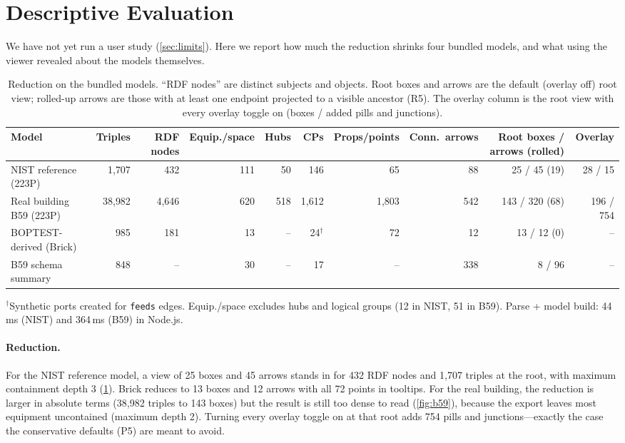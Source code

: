 \documentclass[10pt,twocolumn]{article}
\newcommand{\pred}[1]{\texttt{#1}}   %
\begin{document}
\section{Descriptive Evaluation}
\label{sec:eval}

We have not yet run a user study (\cref{sec:limits}). Here we report how much the
reduction shrinks four bundled models, and what using the viewer revealed about
the models themselves.

\begin{table}[t]
\centering
\small
\caption{Reduction on the bundled models. ``RDF nodes'' are distinct subjects and
objects. Root boxes and arrows are the default (overlay off) root view; rolled-up
arrows are those with at least one endpoint projected to a visible ancestor
(R5). The overlay column is the root view with every overlay toggle on (boxes /
added pills and junctions).}
\label{tab:stats}
\begin{tabular}{lrrrrrrrrr}
\toprule
Model & Triples & RDF nodes & Equip./space & Hubs & CPs & Props/points & Conn.\ arrows & Root boxes / arrows (rolled) & Overlay \\
\midrule
NIST reference (223P) & 1{,}707 & 432 & 111 & 50 & 146 & 65 & 88 & 25 / 45 (19) & 28 / 15 \\
Real building B59 (223P) & 38{,}982 & 4{,}646 & 620 & 518 & 1{,}612 & 1{,}803 & 542 & 143 / 320 (68) & 196 / 754 \\
BOPTEST-derived (Brick) & 985 & 181 & 13 & -- & 24$^\dagger$ & 72 & 12 & 13 / 12 (0) & -- \\
B59 schema summary & 848 & -- & 30 & -- & 17 & -- & 338 & 8 / 96 & -- \\
\bottomrule
\end{tabular}

\smallskip
{\footnotesize $^\dagger$Synthetic ports created for \pred{feeds} edges. Equip./space
excludes hubs and logical groups (12 in NIST, 51 in B59). Parse + model build:
44\,ms (NIST) and 364\,ms (B59) in Node.js.}
\end{table}

\paragraph{Reduction.}
For the NIST reference model, a view of 25 boxes and 45 arrows stands in for
432 RDF nodes and 1{,}707 triples at the root, with maximum containment depth 3
(\cref{tab:stats}). Brick reduces to 13 boxes and 12 arrows with all 72 points in
tooltips. For the real building, the reduction is larger in absolute terms
(38{,}982 triples to 143 boxes) but the result is still too dense to read
(\cref{fig:b59}), because the export leaves most equipment uncontained (maximum
depth 2). Turning every overlay toggle on at that root adds 754 pills and
junctions---exactly the case the conservative defaults (P5) are meant to avoid.
\end{document}
